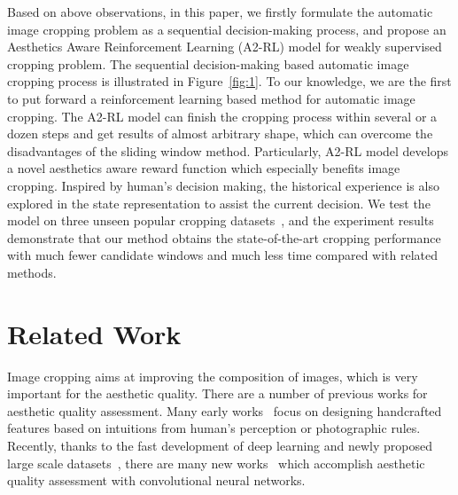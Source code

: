 \documentclass[10pt,twocolumn,letterpaper]{article}
\begin{document}
Based on above observations, in this paper, we firstly formulate the automatic image cropping problem as a sequential decision-making process, and propose an Aesthetics Aware Reinforcement Learning (A2-RL) model for weakly supervised cropping problem. The sequential decision-making based automatic image cropping process is illustrated in Figure~\ref{fig:1}. To our knowledge, we are the first to put forward a reinforcement learning based method for automatic image cropping. The A2-RL model can finish the cropping process within several or a dozen steps and get results of almost arbitrary shape, which can overcome the disadvantages of the sliding window method. Particularly, A2-RL model develops a novel aesthetics aware reward function which especially benefits image cropping. Inspired by human's decision making, the historical experience is also explored in the state representation to assist the current decision. We test the model on three unseen popular cropping datasets~\cite{yan2013learning,fang2014automatic,chen2017quantitative}, and the experiment results demonstrate that our method obtains the state-of-the-art cropping performance with much fewer candidate windows and much less time compared with related methods.

\section{Related Work}
Image cropping aims at improving the composition of images, which is very important for the aesthetic quality. There are a number of previous works for aesthetic quality assessment. Many early works~\cite{ke2006design,datta2006studying,luo2011content,dhar2011high} focus on designing handcrafted features based on intuitions from human's perception or photographic rules. Recently, thanks to the fast development of deep learning and newly proposed large scale datasets~\cite{murray2012ava}, there are many new works~\cite{kong2016photo,mai2016composition,deng2017image} which accomplish aesthetic quality assessment with convolutional neural networks.
\end{document}
